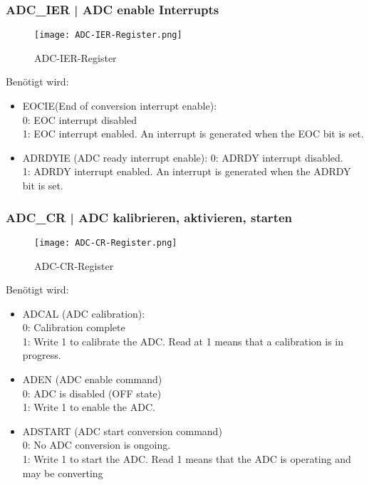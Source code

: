         \subsubsection{ADC\_IER | ADC enable Interrupts}
            \begin{figure}[!htb]
                \centering
                \texttt{[image: ADC-IER-Register.png]}
                \caption{ADC-IER-Register}
                \label{caption:ADC-IER-Register}
            \end{figure}
            \noindent Benötigt wird:
            \begin{itemize}
                \item EOCIE(End of conversion interrupt enable):\\
                0: EOC interrupt disabled\\
                1: EOC interrupt enabled. An interrupt is generated when the EOC bit is set.
                \item ADRDYIE (ADC ready interrupt enable):
                0: ADRDY interrupt disabled.\\
                1: ADRDY interrupt enabled. An interrupt is generated when the ADRDY bit is set.
            \end{itemize}



        \subsubsection{ADC\_CR | ADC kalibrieren, aktivieren, starten}
            \begin{figure}[!htb]
                \centering
                \texttt{[image: ADC-CR-Register.png]}
                \caption{ADC-CR-Register}
                \label{caption:ADC-CR-Register}
            \end{figure}
            \noindent Benötigt wird:
            \begin{itemize}
                \item ADCAL (ADC calibration):\\
                0: Calibration complete \\
                1: Write 1 to calibrate the ADC. Read at 1 means that a calibration is in progress.
                \item ADEN (ADC enable command)\\
                0: ADC is disabled (OFF state)\\
                1: Write 1 to enable the ADC. 
                \item ADSTART (ADC start conversion command)\\
                0: No ADC conversion is ongoing. \\
                1: Write 1 to start the ADC. Read 1 means that the ADC is operating and may be converting
            \end{itemize}


